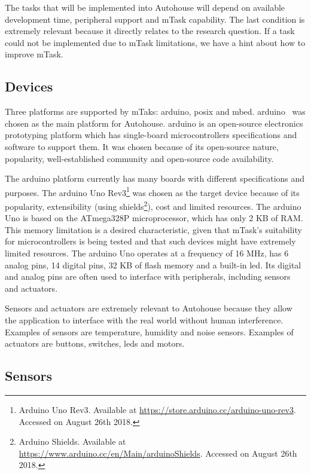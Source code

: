 The tasks that will be implemented into Autohouse will depend on available development time, peripheral support and \gls{mTask} capability. The last condition is extremely relevant because it directly relates to the research question. If a task could not be implemented due to \gls{mTask} limitations, we have a hint about how to improve \gls{mTask}.

\subsection{Devices}\label{sec:autohouse_devices}

Three platforms are supported by mTaks: \gls{arduino}, \acs{posix} and \gls{mbed}. \gls{arduino}~\cite{arduino} was chosen as the main platform for Autohouse. \gls{arduino} is an open-source electronics prototyping platform which has single-board microcontrollers specifications and software to support them. It was chosen because of its open-source nature, popularity, well-established community and open-source code availability.

The \gls{arduino} platform currently has many boards with different specifications and purposes. The \gls{arduino} Uno Rev3\footnote{Arduino Uno Rev3. Available at \url{https://store.arduino.cc/arduino-uno-rev3}. Accessed on August 26th 2018.} was chosen as the target device because of its popularity, extensibility (using shields\footnote{Arduino Shields. Available at \url{https://www.arduino.cc/en/Main/arduinoShields}. Accessed on August 26th 2018.}), cost and limited resources. The \gls{arduino} Uno is based on the ATmega328P microprocessor, which has only 2 KB of RAM. This memory limitation is a desired characteristic, given that \gls{mTask}'s suitability for microcontrollers is being tested and that such devices might have extremely limited resources. The \gls{arduino} Uno operates at a frequency of 16 MHz, has 6 analog pins, 14 digital pins, 32 KB of flash memory and a built-in \acs{led}. Its digital and analog pins are often used to interface with peripherals, including sensors and actuators. 



Sensors and actuators are extremely relevant to Autohouse because they allow the application to interface with the real world without human interference. Examples of sensors are temperature, humidity and noise sensors. Examples of actuators are buttons, switches, \acsp{led} and motors.

\subsection{Sensors}


